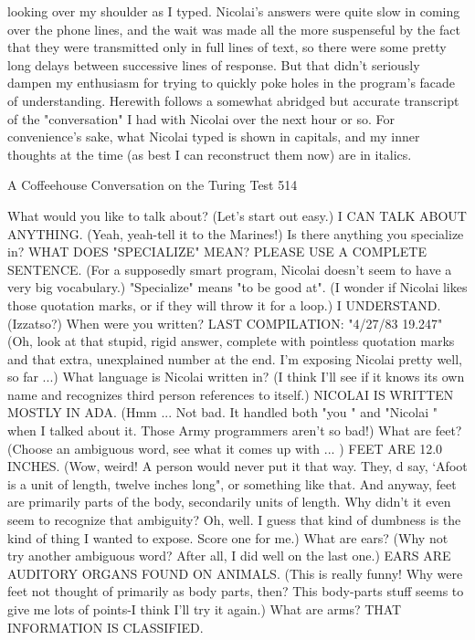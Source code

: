 looking over my shoulder as I typed. Nicolai's answers were quite slow in coming
over the phone lines, and the wait was made all the more suspenseful by the fact that
they were transmitted only in full lines of text, so there were some pretty long delays
between successive lines of response. But that didn't seriously dampen my enthusiasm
for trying to quickly poke holes in the program's facade of understanding.
        Herewith follows a somewhat abridged but accurate transcript of the
"conversation" I had with Nicolai over the next hour or so. For convenience's sake,
what Nicolai typed is shown in capitals, and my inner thoughts at the time (as best I
can reconstruct them now) are in italics.




A Coffeehouse Conversation on the Turing Test                                       514

What would you like to talk about?
(Let's start out easy.)
I CAN TALK ABOUT ANYTHING.
(Yeah, yeah-tell it to the Marines!)
Is there anything you specialize in?
WHAT DOES "SPECIALIZE" MEAN? PLEASE USE A COMPLETE SENTENCE.
(For a supposedly smart program, Nicolai doesn't seem to have a very big
vocabulary.)
"Specialize" means "to be good at".
(I wonder if Nicolai likes those quotation marks, or if they will throw it for a loop.)
I UNDERSTAND.
(Izzatso?)
When were you written?
LAST COMPILATION: "4/27/83 19.247"
(Oh, look at that stupid, rigid answer, complete with pointless quotation marks and
that extra, unexplained number at the end. I'm exposing Nicolai pretty well, so far ...)
What language is Nicolai written in?
(I think I'll see if it knows its own name and recognizes third person references to
itself.)
NICOLAI IS WRITTEN MOSTLY IN ADA.
(Hmm ... Not bad. It handled both "you " and "Nicolai " when I talked about it. Those
Army programmers aren't so bad!)
What are feet?
(Choose an ambiguous word, see what it comes up with ... )
FEET ARE 12.0 INCHES.
(Wow, weird! A person would never put it that way. They, d say, `Afoot is a unit of
length, twelve inches long", or something like that. And anyway, feet are primarily
parts of the body, secondarily units of length. Why didn't it even seem to recognize
that ambiguity? Oh, well. I guess that kind of dumbness is the kind of thing I wanted
to expose. Score one for me.)
What are ears?
(Why not try another ambiguous word? After all, I did well on the last one.)
EARS ARE AUDITORY ORGANS FOUND ON ANIMALS.
(This is really funny! Why were feet not thought of primarily as body parts, then? This
body-parts stuff seems to give me lots of points-I think I'll try it again.)
What are arms?
THAT INFORMATION IS CLASSIFIED.




